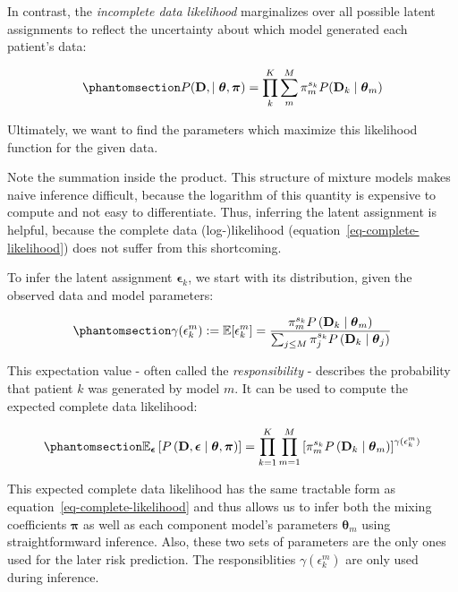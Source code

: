 \documentclass[
  sn-mathphys-num,
]{sn-jnl}
\begin{document}
In contrast, the \emph{incomplete data likelihood} marginalizes over all
possible latent assignments to reflect the uncertainty about which model
generated each patient's data:

\begin{equation}\phantomsection\label{eq-incomplete-likelihood}{
P(\mathbf{D}, \mid \boldsymbol{\theta}, \boldsymbol{\pi}) = \prod_{k}^{K} \sum_{m}^{M} \pi_m^{s_k} P(\mathbf{D}_k \mid \boldsymbol{\theta}_m)
}\end{equation}

Ultimately, we want to find the parameters which maximize this
likelihood function for the given data.

Note the summation inside the product. This structure of mixture models
makes naive inference difficult, because the logarithm of this quantity
is expensive to compute and not easy to differentiate. Thus, inferring
the latent assignment is helpful, because the complete data
(log-)likelihood (equation~\ref{eq-complete-likelihood}) does not suffer
from this shortcoming.

To infer the latent assignment \(\boldsymbol{\epsilon}_k\), we start
with its distribution, given the observed data and model parameters:

\begin{equation}\phantomsection\label{eq-responsibilities}{
\gamma(\epsilon_k^m) := \mathbb{E}[\epsilon_k^m] = \frac{\pi_m^{s_k} P \left( \mathbf{D}_k \mid \boldsymbol{\theta}_m \right)}{\sum_{j \leq M} \pi_j^{s_k} P \left( \mathbf{D}_k \mid \boldsymbol{\theta}_j \right)}
}\end{equation}

This expectation value - often called the \emph{responsibility} -
describes the probability that patient \(k\) was generated by model
\(m\). It can be used to compute the expected complete data likelihood:

\begin{equation}\phantomsection\label{eq-expected-complete-likelihood}{
\mathbb{E}_{\boldsymbol{\epsilon}} \left[ P \left( \mathbf{D}, \boldsymbol{\epsilon} \mid \boldsymbol{\theta}, \boldsymbol{\pi} \right) \right] = \prod_{k=1}^K \prod_{m=1}^M \left[ \pi_m^{s_k} P \left( \mathbf{D}_k \mid \boldsymbol{\theta}_m \right) \right]^{\gamma(\epsilon_k^m)}
}\end{equation}

This expected complete data likelihood has the same tractable form as
equation~\ref{eq-complete-likelihood} and thus allows us to infer both
the mixing coefficients \(\boldsymbol{\pi}\) as well as each component
model's parameters \(\boldsymbol{\theta}_m\) using straightformward
inference. Also, these two sets of parameters are the only ones used for
the later risk prediction. The responsiblities \(\gamma(\epsilon_k^m)\)
are only used during inference.
\end{document}

